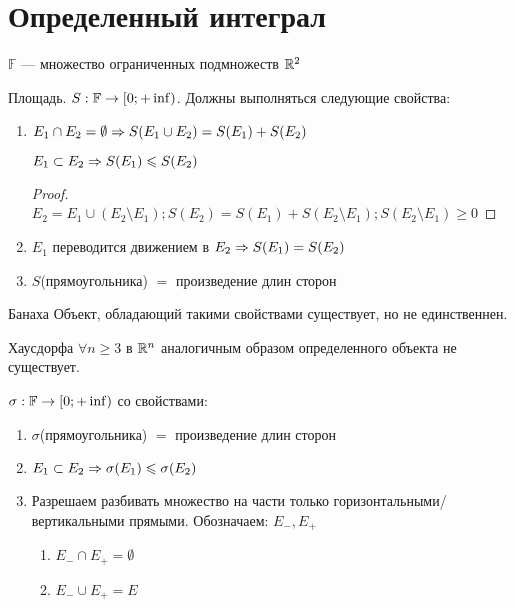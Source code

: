 ﻿\section{Определенный интеграл}

\begin{Def}
$\mathbb{F}$ --- множество ограниченных подмножеств $\mathbb{R}^2$
\end{Def}

\begin{Def}
Площадь. $S: \mathbb{F} \rightarrow [0; +\inf)$. Должны выполняться следующие свойства:

\begin{enumerate}
\item $E_1 \cap E_2 = \emptyset \Rightarrow S(E_1 \cup E_2) = S(E_1) + S(E_2)$
\begin{conseq}
$E_1 \subset E_2 \Rightarrow S(E_1) \leqslant S(E_2)$
\end{conseq}
\begin{proof}
$E_2 = E_1 \cup (E_2 \setminus E_1); S(E_2) = S(E_1) + S(E_2 \setminus E_1); S(E_2 \setminus E_1) \geqslant 0$
\end{proof}
\item $E_1$ переводится движением в $E_2 \Rightarrow S(E_1) = S(E_2)$
\item $S$(прямоугольника) $=$ произведение длин сторон
\end{enumerate} 
\end{Def}

\begin{theorem}{Банаха}
Объект, обладающий такими свойствами существует, но не единственнен.
\end{theorem}

\begin{theorem}{Хаусдорфа}
$\forall n \geqslant 3$ в $\mathbb{R}^n$ аналогичным образом определенного объекта не существует.
\end{theorem}

\begin{Def}
$\sigma: \mathbb{F} \rightarrow [0; +\inf)$ со свойствами:
\begin{enumerate}
\item $\sigma$(прямоугольника) $=$ произведение длин сторон
\item $E_1 \subset E_2 \Rightarrow \sigma(E_1) \leqslant \sigma(E_2)$
\item Разрешаем разбивать множество на части только горизонтальными/вертикальными прямыми. Обозначаем: $E_{-}, E_{+}$
\begin{enumerate}
\item $E_{-} \cap E_{+} = \emptyset$
\item $E_{-} \cup E_{+} = E$
\end{enumerate}
\end{enumerate} 
\end{Def}

